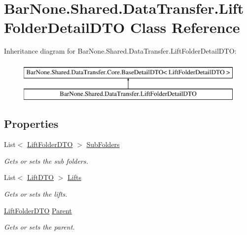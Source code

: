 \hypertarget{class_bar_none_1_1_shared_1_1_data_transfer_1_1_lift_folder_detail_d_t_o}{}\section{Bar\+None.\+Shared.\+Data\+Transfer.\+Lift\+Folder\+Detail\+D\+TO Class Reference}
\label{class_bar_none_1_1_shared_1_1_data_transfer_1_1_lift_folder_detail_d_t_o}
Inheritance diagram for Bar\+None.\+Shared.\+Data\+Transfer.\+Lift\+Folder\+Detail\+D\+TO\+:\begin{figure}[H]
\begin{center}
\leavevmode
\includegraphics[height=2.000000cm]{class_bar_none_1_1_shared_1_1_data_transfer_1_1_lift_folder_detail_d_t_o}
\end{center}
\end{figure}
\subsection*{Properties}
\begin{DoxyCompactItemize}
\item 
List$<$ \mbox{\hyperlink{class_bar_none_1_1_shared_1_1_data_transfer_1_1_lift_folder_d_t_o}{Lift\+Folder\+D\+TO}} $>$ \mbox{\hyperlink{class_bar_none_1_1_shared_1_1_data_transfer_1_1_lift_folder_detail_d_t_o_a47e6be9f7dd6059f50e226daff4729a9}{Sub\+Folders}}
\begin{DoxyCompactList}\small\item\em Gets or sets the sub folders. \end{DoxyCompactList}\item 
List$<$ \mbox{\hyperlink{class_bar_none_1_1_shared_1_1_data_transfer_1_1_lift_d_t_o}{Lift\+D\+TO}} $>$ \mbox{\hyperlink{class_bar_none_1_1_shared_1_1_data_transfer_1_1_lift_folder_detail_d_t_o_a2f5d90fa55e2548b8be654c826550d0c}{Lifts}}
\begin{DoxyCompactList}\small\item\em Gets or sets the lifts. \end{DoxyCompactList}\item 
\mbox{\hyperlink{class_bar_none_1_1_shared_1_1_data_transfer_1_1_lift_folder_d_t_o}{Lift\+Folder\+D\+TO}} \mbox{\hyperlink{class_bar_none_1_1_shared_1_1_data_transfer_1_1_lift_folder_detail_d_t_o_ae451afd5ba1343b5fd564caf976a040d}{Parent}}
\begin{DoxyCompactList}\small\item\em Gets or sets the parent. \end{DoxyCompactList}\end{DoxyCompactItemize}


